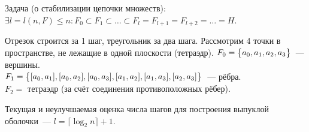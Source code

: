 Задача (о стабилизации цепочки множеств): \\
$\exists l = l(n, F) \leqslant n\colon F_0 \subset F_1 \subset \ldots \subset F_l = F_{l+1} = F_{l+2} = \ldots = H$.

Отрезок строится за 1 шаг, треугольник за два шага.
Рассмотрим 4 точки в пространстве, не лежащие в одной плоскости (тетраэдр).
$F_0 = \bigl\{ a_0, a_1, a_2, a_3 \bigr\}$~--- вершины. \\
$F_1 = \bigl\{ [a_0, a_1], [a_0, a_2], [a_0, a_3], [a_1, a_2], [a_1, a_3], [a_2, a_3] \bigr\}$~--- рёбра. \\
$F_2 = $ тетраэдр (за счёт соединения противоположных рёбер).

Текущая и неулучшаемая оценка числа шагов для построения выпуклой оболочки~--- $l = \lceil \log_2 n \rceil + 1$.